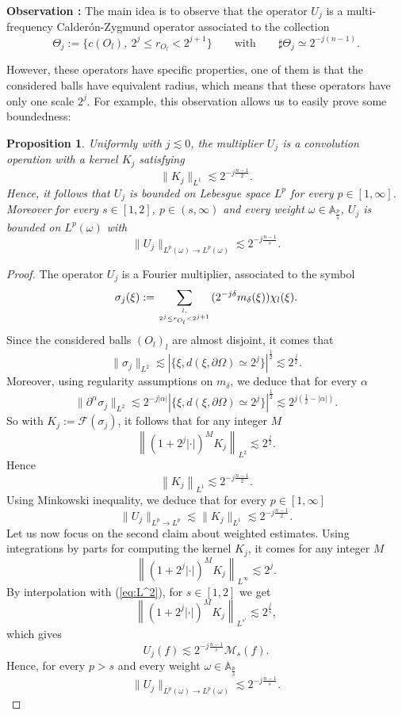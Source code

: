 \documentclass[11pt]{amsart}
\newtheorem{proposition}[theorem]{Proposition}
\theoremstyle{remark}
\newcommand{\gb}{\bigskip\noindent}
\newcommand{\M}{{\mathcal M}}
\begin{document}
\gb
{\bf Observation :} The main idea is to observe that the operator $U_j$ is a multi-frequency Calder\'on-Zygmund operator associated to the collection 
$$ \Theta_j :=\{ c(O_l), \ 2^j \leq r_{O_l}< 2^{j+1} \} \qquad \textrm{with} \qquad \sharp \Theta_j \simeq 2^{-j(n-1)}.$$

However, these operators have specific properties, one of them is that the considered balls have equivalent radius, which means that these operators have only one scale $2^{j}$. For example, this observation allows us to easily prove some boundedness:

\begin{proposition} \label{prop} Uniformly with $j\lesssim 0$, the multiplier $U_j$ is a convolution operation with a kernel $K_j$ satisfying
$$ \|K_j\|_{L^1} \lesssim 2^{-j \frac{n-1}{2}}.$$
Hence, it follows that $U_j$ is bounded on Lebesgue space $L^p$ for every $p\in[1,\infty]$. Moreover for every $s\in[1,2]$, $p\in(s,\infty)$ and every weight $\omega\in {\mathbb A}_{\frac{p}{s}}$, $U_j$ is bounded on $L^p(\omega)$ with
$$ \| U_j\|_{L^p(\omega) \rightarrow L^p(\omega)} \lesssim 2^{-j\frac{n-1}{s}}.$$
\end{proposition}

\begin{proof} The operator $U_j$ is a Fourier multiplier, associated to the symbol 
$$\sigma_j(\xi):=\sum_{\genfrac{}{}{0pt}{}{l,}{2^j \leq r_{O_l}< 2^{j+1}}} (2^{-j\delta} m_\delta(\xi)) \chi_l(\xi).$$ 
Since the considered balls $(O_l)_l$ are almost disjoint, it comes that 
$$ \|\sigma_j\|_{L^2} \lesssim |\{\xi, d(\xi,\partial \Omega)\simeq 2^j \}|^{\frac{1}{2}} \lesssim 2^{\frac{j}{2}}.$$
Moreover, using regularity assumptions on $m_\delta$, we deduce that for every $\alpha$
$$ \|\partial^\alpha \sigma_j\|_{L^2} \lesssim 2^{-j|\alpha|} |\{\xi, d(\xi,\partial \Omega) \simeq 2^j \}|^{\frac{1}{2}} \lesssim 2^{j(\frac{1}{2}-|\alpha|)}.$$
So with $K_j:= \mathcal{F}(\sigma_j)$, it follows that for any integer $M$
\begin{equation} \left\| (1+2^{j}|\cdot|)^{M} K_j\right\|_{L^2} \lesssim 2^{\frac{j}{2}}. \label{eq:L^2} \end{equation}
Hence
$$ \left\| K_j\right\|_{L^1} \lesssim 2^{-j\frac{n-1}{2}}.$$
Using Minkowski inequality, we deduce that for every $p\in[1,\infty]$
$$ \| U_j\|_{L^p \to L^p} \lesssim \|K_j\|_{L^1} \lesssim  2^{-j\frac{n-1}{2}}.$$
Let us now focus on the second claim about weighted estimates. Using integrations by parts for computing the kernel $K_j$, it comes for any integer $M$
\begin{equation} \left\| (1+2^{j}|\cdot|)^{M} K_j\right\|_{L^\infty} \lesssim 2^{j}. \end{equation}
By interpolation with (\ref{eq:L^2}), for $s\in[1,2]$ we get
\begin{equation} \left\| (1+2^{j}|\cdot|)^{M} K_j\right\|_{L^{s'}} \lesssim 2^{\frac{j}{s}}, \end{equation}
which gives
$$  U_j(f) \lesssim 2^{-j\frac{n-1}{s}} \M_{s}(f).$$
Hence, for every $p> s$ and every weight $\omega \in {\mathbb A}_{\frac{p}{s}}$
$$ \|U_j\|_{L^p(\omega) \to L^p(\omega)} \lesssim 2^{-j\frac{n-1}{s}}.$$
\end{proof}
\end{document}
